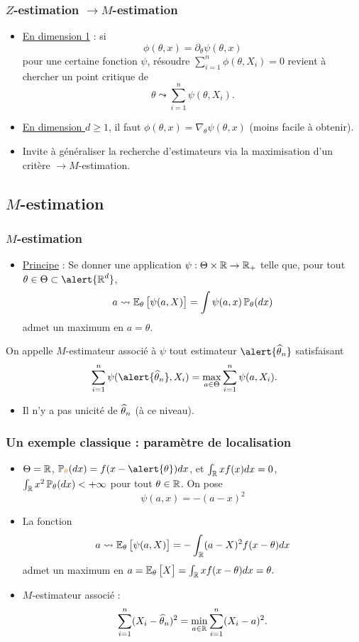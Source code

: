 \begin{frame}
\frametitle{$Z$-estimation $\rightarrow M$-estimation}
\begin{itemize}
\item \underline{En dimension 1} : si
$$\boxed{\phi(\theta,x) = \partial_\theta\psi(\theta, x)}$$
pour une certaine fonction $\psi$, résoudre
$\sum_{i = 1}^n \phi(\theta, X_i)=0$
revient à \alert{chercher un point critique} de
$$\theta \leadsto \sum_{i = 1}^n\psi(\theta, X_i).$$
\item \underline{En dimension $d \geq 1$}, il faut $\phi(\theta, x) = \nabla_\theta \psi(\theta, x)$ (moins facile à obtenir).
\item \alert{ Invite à généraliser} la recherche d'estimateurs via la maximisation d'un critère $\rightarrow M$-estimation.
\end{itemize}
\end{frame}

\subsection{$M$-estimation}

\begin{frame}
\frametitle{$M$-estimation}
\begin{itemize}
\item \underline{Principe} : Se donner une application $\psi : \Theta \times \operatorname{{\mathbb R}} \rightarrow \operatorname{{\mathbb R}}_+$ telle que, pour tout $\theta \in \Theta \subset \alert{\R^d}$,
$$a \leadsto \operatorname{{\mathbb E}}_\theta\big[\psi(a,X)\big] = \int \psi(a,x)\operatorname{{\mathbb P}}_\theta(dx)$$
admet \alert{un maximum en $a=\theta$}.
\end{itemize}
\begin{df}
On appelle $M$-estimateur associé à $\psi$ tout estimateur $\alert{\est}$ satisfaisant
$$\sum_{i = 1}^n \psi(\alert{\est}, X_i) = \max_{a \in \Theta}\sum_{i = 1}^n\psi(a, X_i).$$
\end{df}
\begin{itemize}
\item Il n'y a pas unicité de $\operatorname{\widehat \theta_{\mathnormal{n}}}$ (à ce niveau).
\end{itemize}
\end{frame}

\begin{frame}
\frametitle{Un exemple classique : paramètre de localisation}
\begin{itemize}
\item $\Theta = \operatorname{{\mathbb R}}$, $\PP_{\tco{\theta}}(dx) = f(x-\alert{\theta})dx$, et $\int_{\operatorname{{\mathbb R}}}xf(x)dx=0$, $\int_{\operatorname{{\mathbb R}}}x^2\operatorname{{\mathbb P}}_\theta(dx)<+\infty$ pour tout $\theta \in \operatorname{{\mathbb R}}$. On pose
$$\boxed{\psi(a,x)=-(a-x)^2}$$
\item La fonction
$$a \leadsto \operatorname{{\mathbb E}}_\theta\big[\psi(a,X)\big] =
-\int_{\operatorname{{\mathbb R}}}(a-X)^2f(x-\theta)dx$$
admet un \alert{maximum} en $a=\operatorname{{\mathbb E}}_\theta\big[X\big] = \int_{\operatorname{{\mathbb R}}}xf(x-\theta)dx=\theta.$
\item \alert{$M$-estimateur associé :}
$$\sum_{i = 1}^n(X_i-\operatorname{\widehat \theta_{\mathnormal{n}}})^2 = \min_{a \in \operatorname{{\mathbb R}}}\sum_{i = 1}^n (X_i-a)^2.$$
\end{itemize}
\end{frame}

